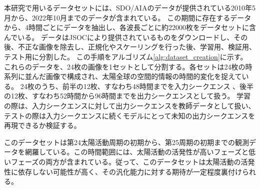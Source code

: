 本研究で用いるデータセットには、SDO/AIAのデータが提供されている2010年5月から、2022年10月までのデータが含まれている。  
この期間に存在するデータから、4時間ごとにデータを抽出し、各波長ごとに約22000枚をデータセットに含んでいる。
データはJSOCにより提供されているものをダウンロードし、その後、不正な画像を除去し、正規化やスケーリングを行った後、学習用、検証用、テスト用に分割した。
この手順をアルゴリズム\ref{alg:dataset_creation}に示す。
これらのデータを、24枚の画像を1セットとして分割する。各セットは24枚の時系列に並んだ画像で構成され、太陽全球の空間的情報の時間的変化を捉えている。
24枚のうち、前半の12枚、すなわち48時間までを入力シークエンス 、後半の12枚、すなわち52時間から96時間までを出力シークエンスとして扱う。
学習の際は、入力シークエンスに対して出力シークエンスを教師データとして扱い、テストの際は入力シークエンスに続くモデルにとって未知の出力シークエンスを再現できるか検証する。

このデータセットは第24太陽活動周期の初期から、第25周期の初期までの観測データを網羅している。この時間範囲には、太陽活動の活発性が高いフェーズと低いフェーズの両方が含まれている。従って、このデータセットは太陽活動の活発性に依存しない可能性が高く、その汎化能力に対する期待が一定程度裏付けられる。

